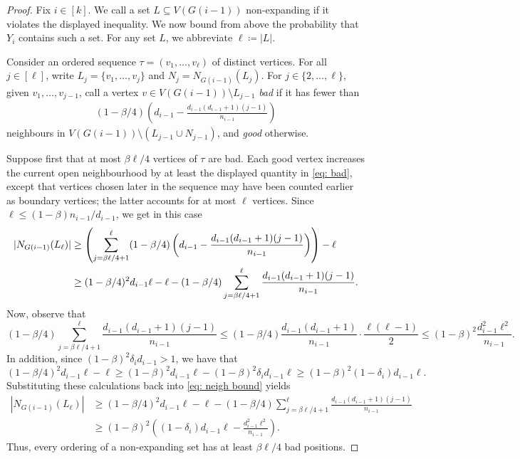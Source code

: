\documentclass[reqno,a4paper]{amsart}
\theoremstyle{definition}
\begin{document}
\begin{proof}
Fix $i\in [k]$. 
We call a set $L\subseteq V(G(i-1))$ non-expanding if it violates the displayed inequality. We now bound from above the probability that $Y_i$ contains such a set. For any set $L$, we abbreviate $\ell\coloneqq |L|$.

Consider an ordered sequence $\tau=(v_1,\ldots,v_\ell)$ of distinct vertices. 
For all $j\in [\ell]$, write $L_j=\{v_1,\ldots,v_j\}$ and $N_j=N_{G(i-1)}(L_j)$. For $j\in \{2,\ldots, \ell\}$, given $v_1,\ldots,v_{j-1}$, call a vertex $v\in V(G(i-1))\setminus L_{j-1}$ \textit{bad} if it has fewer than
\begin{align}
 (1-\beta/4)\left(d_{i-1}-\frac{d_{i-1}(d_{i-1}+1)(j-1)}{n_{i-1}}\right)\label{eq: bad}   
\end{align}
neighbours in $V(G(i-1))\setminus(L_{j-1}\cup N_{j-1})$, and \textit{good} otherwise.

Suppose first that at most $\beta\ell/4$ vertices of $\tau$ are bad. Each good vertex increases the current open neighbourhood by at least the displayed quantity in \eqref{eq: bad}, except that vertices chosen later in the sequence may have been counted earlier as boundary vertices; the latter accounts for at most $\ell$ vertices. Since $\ell\le(1-\beta)n_{i-1}/d_{i-1}$, we get in this case
\begin{align}\label{eq: neigh bound}
    |N_{G(i-1)}(L_\ell)|\notag
    &\ge \left(\sum_{j=\beta\ell/4+1}^{\ell}(1-\beta/4)\left(d_{i-1}-\frac{d_{i-1}(d_{i-1}+1)(j-1)}{n_{i-1}}\right)\right)-\ell \\
    &\ge (1-\beta/4)^2d_{i-1}\ell-\ell-(1-\beta/4)\sum_{j=\beta\ell/4+1}^\ell\frac{d_{i-1}(d_{i-1}+1)(j-1)}{n_{i-1}}.
\end{align}
Now, observe that 
\[
    (1-\beta/4)\sum_{j=\beta\ell/4+1}^\ell\frac{d_{i-1}(d_{i-1}+1)(j-1)}{n_{i-1}}\le (1-\beta/4)\frac{d_{i-1}(d_{i-1}+1)}{n_{i-1}}\cdot \frac{\ell(\ell-1)}{2}\le  (1-\beta)^2\frac{d_{i-1}^2\ell^2}{n_{i-1}}.
\]
In addition, since $(1-\beta)^2\delta_id_{i-1}>1$, we have that 
\[
    (1-\beta/4)^2d_{i-1}\ell-\ell\ge (1-\beta)^2d_{i-1}\ell-(1-\beta)^2\delta_id_{i-1}\ell\ge (1-\beta)^2(1-\delta_{i})d_{i-1}\ell.
\]
Substituting these calculations back into \eqref{eq: neigh bound} yields
\begin{align*}
    |N_{G(i-1)}(L_\ell)|
    &\ge (1-\beta/4)^2d_{i-1}\ell-\ell-(1-\beta/4)\sum_{j=\beta\ell/4+1}^\ell\frac{d_{i-1}(d_{i-1}+1)(j-1)}{n_{i-1}}\\
    &\ge (1-\beta)^2\left((1-\delta_{i})d_{i-1}\ell-\frac{d_{i-1}^2\ell^2}{n_{i-1}}\right).
\end{align*}
Thus, every ordering of a non-expanding set has at least $\beta\ell/4$ bad positions.


\end{proof}
\end{document}
